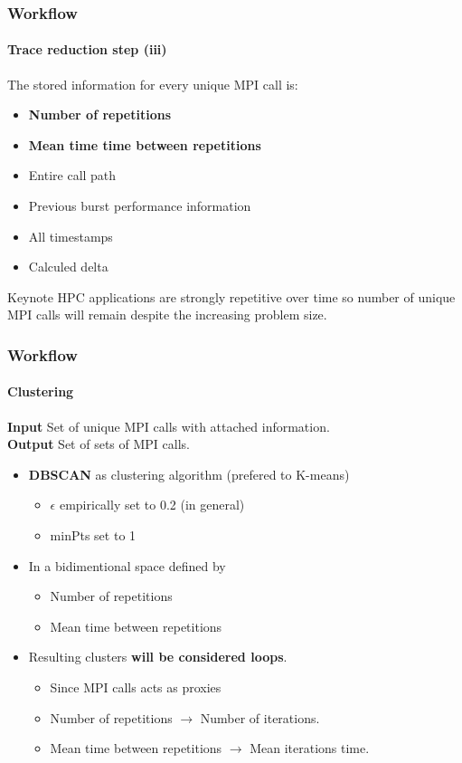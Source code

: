\documentclass{beamer}
\begin{document}
\begin{frame}
\frametitle{Workflow}
\framesubtitle{Trace reduction step (iii)}
The stored information for every unique MPI call is:
\begin{itemize}
	\item \textbf{Number of repetitions}
	\item \textbf{Mean time time between repetitions}
	\item Entire call path
	\item Previous burst performance information
	\item All timestamps
	\item Calculed delta
\end{itemize}
\vfill
\pause
\begin{block}{Keynote}
	HPC applications are strongly repetitive over time so number of unique MPI calls will remain despite the increasing problem size.
\end{block}
\end{frame}

\begin{frame}
\frametitle{Workflow}
\framesubtitle{Clustering}

\textbf{Input} Set of unique MPI calls with attached information.\\
\textbf{Output} Set of sets of MPI calls.
\vspace{10px}
\pause
\begin{itemize}
	\item \textbf{DBSCAN} as clustering algorithm (prefered to K-means)
	\begin{itemize}
		\item $\epsilon$ empirically set to 0.2 (in general)
		\item minPts set to 1
	\end{itemize}
\pause
	\item In a bidimentional space defined by
	\begin{itemize}
		\item Number of repetitions
		\item Mean time between repetitions
	\end{itemize}
\pause
	\item Resulting clusters \textbf{will be considered loops}.
	\begin{itemize}
		\item Since MPI calls acts as proxies
		\item Number of repetitions $\rightarrow$ Number of iterations.
		\item Mean time between repetitions $\rightarrow$ Mean iterations time.
	\end{itemize}
	
\end{itemize}
\end{frame}
\end{document}
